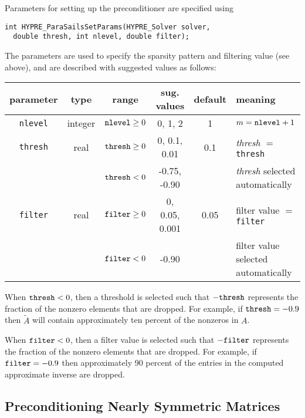 Parameters for setting up the preconditioner are specified using
\begin{display}
\begin{verbatim}
int HYPRE_ParaSailsSetParams(HYPRE_Solver solver, 
  double thresh, int nlevel, double filter);
\end{verbatim}
\end{display}

The parameters are used to specify the sparsity pattern and filtering value
(see above), and are described with suggested values as follows:

\begin{center}
\begin{tabular}{|c|c|c|c|c|l|} \hline
parameter    & type    & range                & sug. values  & default & meaning \\ \hline
{\tt nlevel} & integer & ${\tt nlevel} \ge 0$ & 0, 1, 2      & 1   & $m={\tt nlevel}+1$\\
\hline
{\tt thresh} & real    & ${\tt thresh} \ge 0$ & 0, 0.1, 0.01 & 0.1 & {\em thresh} $=$ {\tt thresh}\\
             &         & ${\tt thresh}  <  0$ & -0.75, -0.90 &     & {\em thresh} selected automatically\\
\hline
{\tt filter} & real    & ${\tt filter} \ge 0$ & 0, 0.05, 0.001 & 0.05 & filter value $=$ {\tt filter}\\
             &         & ${\tt filter}  <  0$ & -0.90        &     & filter value selected automatically\\
\hline
\end{tabular}
\end{center}

When ${\tt thresh} < 0$, then a threshold is selected such that 
$-{\tt thresh}$ represents the fraction of the nonzero elements
that are dropped.  For example, if ${\tt thresh} = -0.9$ then
$\tilde{A}$ will contain approximately ten percent of the nonzeros
in $A$.

When ${\tt filter} < 0$, then a filter value is selected such that 
$-{\tt filter}$ represents the fraction of the nonzero elements
that are dropped.  For example, if ${\tt filter} = -0.9$ then
approximately 90 percent of the entries in the computed approximate 
inverse are dropped.


\subsection{Preconditioning Nearly Symmetric Matrices}
\label{nearly}

